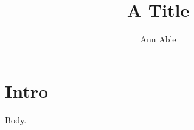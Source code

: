 \documentclass{article}
\title{A Title}
\author{Ann Able}
\begin{document}
\maketitle
\section{Intro}
Body.
\end{document}
